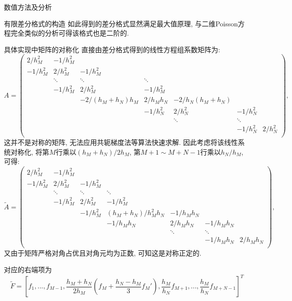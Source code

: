 \documentclass{article}
\begin{document}
\begin{section}{数值方法及分析}
\begin{subsection}{有限差分格式的构造}
        如此得到的差分格式显然满足最大值原理, 与二维Poisson方程完全类似的分析可得该格式也是二阶的.
    \end{subsection}
    \begin{subsection}{具体实现中矩阵的对称化}
        直接由差分格式得到的线性方程组系数矩阵为:
        $$A=\begin{pmatrix}
            2/h_M^2 & -1/h_M^2 &  &  &  & &   \\
            -1/h_M^2 & 2/h_M^2 & -1/h_M^2 &  &  & & \\
             & \ddots & \ddots & \ddots & & & \\
             & -1/h_M^2 & 2/h_M^2 & -1/h_M^2 &  & & \\
             & & -2/(h_M+h_N)h_M & 2/h_Mh_N & -2/h_N(h_M+h_N) & & \\
             & & & -1/h_N^2 & 2/h_N^2 & -1/h_N^2 & \\
             & & &  & \ddots & \ddots & \\
             & & &  &  & -1/h_N^2 & 2/h_N^2 \\
        \end{pmatrix},$$
        这并不是对称的矩阵, 无法应用共轭梯度法等算法快速求解. 因此考虑将该线性系统对称化, 将第$M$行乘以$(h_M+h_N)/2h_M$, 第$M+1\sim M+N-1$行乘以$h_N/h_M$, 可得:
        $$\tilde{A}=\begin{pmatrix}
            2/h_M^2 & -1/h_M^2 &  &  &  & &   \\
            -1/h_M^2 & 2/h_M^2 & -1/h_M^2 &  &  & &  \\
             & \ddots & \ddots & \ddots & & & \\
             & -1/h_M^2 & 2/h_M^2 & -1/h_M^2 &  & & \\
             & & -1/h_M^2 & (h_M+h_N)/h_M^2h_N & -1/h_Mh_N & & \\
             & & & -1/h_Mh_N & 2/h_Mh_N & -1/h_Mh_N & \\
             & & &  & \ddots & \ddots & \\
             & & &  &  & -1/h_Mh_N & 2/h_Mh_N \\
        \end{pmatrix},$$
        又由于矩阵严格对角占优且对角元均为正数, 可知这是对称正定的.

        对应的右端项为
        $$\tilde{F}=[f_1,...,f_{M-1},\frac{h_M+h_N}{2h_M}(f_M+\frac{h_N-h_M}{3}f_M'),\frac{h_M}{h_N}f_{M+1},...,\frac{h_M}{h_N}f_{M+N-1}]^T$$
    \end{subsection}
\end{section}
\end{document}
